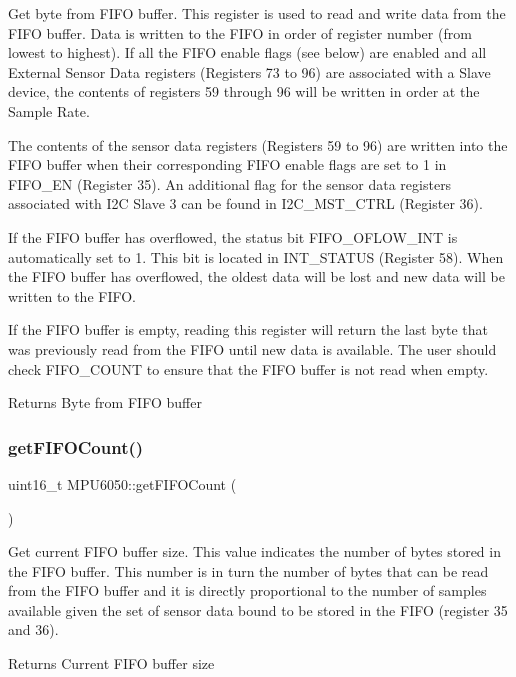 Get byte from F\+I\+FO buffer. This register is used to read and write data from the F\+I\+FO buffer. Data is written to the F\+I\+FO in order of register number (from lowest to highest). If all the F\+I\+FO enable flags (see below) are enabled and all External Sensor Data registers (Registers 73 to 96) are associated with a Slave device, the contents of registers 59 through 96 will be written in order at the Sample Rate.

The contents of the sensor data registers (Registers 59 to 96) are written into the F\+I\+FO buffer when their corresponding F\+I\+FO enable flags are set to 1 in F\+I\+F\+O\+\_\+\+EN (Register 35). An additional flag for the sensor data registers associated with I2C Slave 3 can be found in I2\+C\+\_\+\+M\+S\+T\+\_\+\+C\+T\+RL (Register 36).

If the F\+I\+FO buffer has overflowed, the status bit F\+I\+F\+O\+\_\+\+O\+F\+L\+O\+W\+\_\+\+I\+NT is automatically set to 1. This bit is located in I\+N\+T\+\_\+\+S\+T\+A\+T\+US (Register 58). When the F\+I\+FO buffer has overflowed, the oldest data will be lost and new data will be written to the F\+I\+FO.

If the F\+I\+FO buffer is empty, reading this register will return the last byte that was previously read from the F\+I\+FO until new data is available. The user should check F\+I\+F\+O\+\_\+\+C\+O\+U\+NT to ensure that the F\+I\+FO buffer is not read when empty.

\begin{DoxyReturn}{Returns}
Byte from F\+I\+FO buffer 
\end{DoxyReturn}
\mbox{\label{class_m_p_u6050_ad96c7a75a39327ebaae01386bcbc58dd}} 
\subsubsection{\texorpdfstring{getFIFOCount()}{getFIFOCount()}}
{\footnotesize\ttfamily uint16\+\_\+t M\+P\+U6050\+::get\+F\+I\+F\+O\+Count (\begin{DoxyParamCaption}{ }\end{DoxyParamCaption})}

Get current F\+I\+FO buffer size. This value indicates the number of bytes stored in the F\+I\+FO buffer. This number is in turn the number of bytes that can be read from the F\+I\+FO buffer and it is directly proportional to the number of samples available given the set of sensor data bound to be stored in the F\+I\+FO (register 35 and 36). \begin{DoxyReturn}{Returns}
Current F\+I\+FO buffer size 
\end{DoxyReturn}
\mbox{\label{class_m_p_u6050_ae2687a09ebe0d7fbbf74f560e0dd9a44}} 
